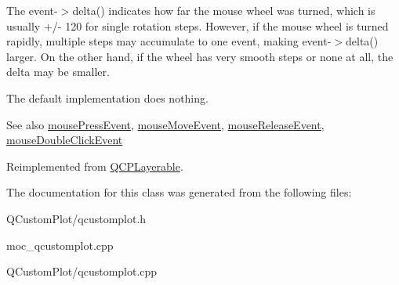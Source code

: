 The {\ttfamily event-\/$>$delta()} indicates how far the mouse wheel was turned, which is usually +/-\/ 120 for single rotation steps. However, if the mouse wheel is turned rapidly, multiple steps may accumulate to one event, making {\ttfamily event-\/$>$delta()} larger. On the other hand, if the wheel has very smooth steps or none at all, the delta may be smaller.

The default implementation does nothing.

\begin{DoxySeeAlso}{See also}
\mbox{\hyperlink{class_q_c_p_color_scale_a91f633b97ffcd57fdf8cd814974c20e6}{mouse\+Press\+Event}}, \mbox{\hyperlink{class_q_c_p_color_scale_a3b2bd79725aefaf2630fc76e90939442}{mouse\+Move\+Event}}, \mbox{\hyperlink{class_q_c_p_color_scale_a6a35dd39ab4e5cb2d7b29ebb4d5b61b0}{mouse\+Release\+Event}}, \mbox{\hyperlink{class_q_c_p_layerable_a4171e2e823aca242dd0279f00ed2de81}{mouse\+Double\+Click\+Event}} 
\end{DoxySeeAlso}


Reimplemented from \mbox{\hyperlink{class_q_c_p_layerable_a47dfd7b8fd99c08ca54e09c362b6f022}{Q\+C\+P\+Layerable}}.



The documentation for this class was generated from the following files\+:\begin{DoxyCompactItemize}
\item 
Q\+Custom\+Plot/qcustomplot.\+h\item 
moc\+\_\+qcustomplot.\+cpp\item 
Q\+Custom\+Plot/qcustomplot.\+cpp\end{DoxyCompactItemize}
